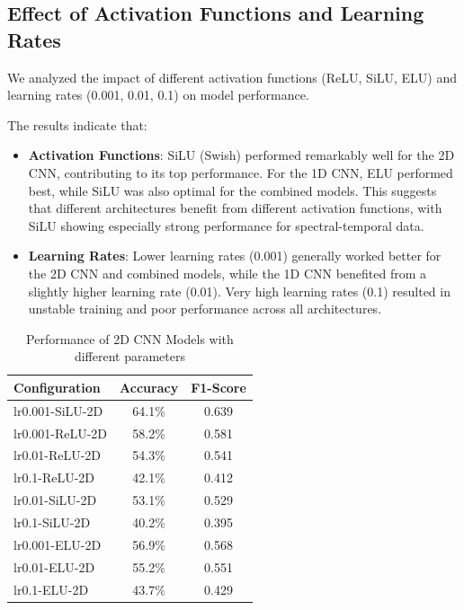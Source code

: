 \subsection{Effect of Activation Functions and Learning Rates}

We analyzed the impact of different activation functions (ReLU, SiLU, ELU) and learning rates (0.001, 0.01, 0.1) on model performance.

The results indicate that:

\begin{itemize}
    \item \textbf{Activation Functions}: SiLU (Swish) performed remarkably well for the 2D CNN, contributing to its top performance. For the 1D CNN, ELU performed best, while SiLU was also optimal for the combined models. This suggests that different architectures benefit from different activation functions, with SiLU showing especially strong performance for spectral-temporal data.
    
    \item \textbf{Learning Rates}: Lower learning rates (0.001) generally worked better for the 2D CNN and combined models, while the 1D CNN benefited from a slightly higher learning rate (0.01). Very high learning rates (0.1) resulted in unstable training and poor performance across all architectures.
\end{itemize}

\begin{table}[h]
\centering
\caption{Performance of 2D CNN Models with different parameters}
\label{tab:2d_results}
\begin{tabular}{@{}lcc@{}}
\toprule
\textbf{Configuration} & \textbf{Accuracy} & \textbf{F1-Score} \\
\midrule
lr0.001-SiLU-2D & 64.1\% & 0.639 \\
lr0.001-ReLU-2D & 58.2\% & 0.581 \\
lr0.01-ReLU-2D & 54.3\% & 0.541 \\
lr0.1-ReLU-2D & 42.1\% & 0.412 \\
lr0.01-SiLU-2D & 53.1\% & 0.529 \\
lr0.1-SiLU-2D & 40.2\% & 0.395 \\
lr0.001-ELU-2D & 56.9\% & 0.568 \\
lr0.01-ELU-2D & 55.2\% & 0.551 \\
lr0.1-ELU-2D & 43.7\% & 0.429 \\
\bottomrule
\end{tabular}
\end{table}

